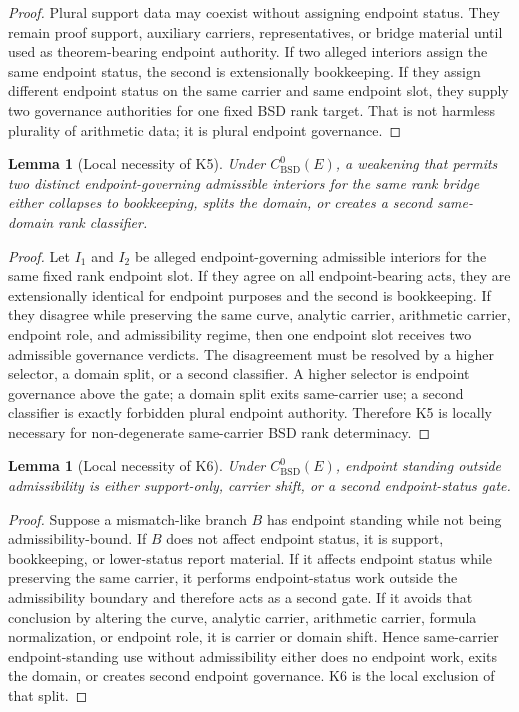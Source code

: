 \documentclass[11pt]{article}
\newtheorem{lemma}[theorem]{Lemma}
\newcommand{\BSD}{\mathrm{BSD}}
\begin{document}
\begin{proof}
Plural support data may coexist without assigning endpoint status. They remain proof support, auxiliary carriers, representatives, or bridge material until used as theorem-bearing endpoint authority. If two alleged interiors assign the same endpoint status, the second is extensionally bookkeeping. If they assign different endpoint status on the same carrier and same endpoint slot, they supply two governance authorities for one fixed BSD rank target. That is not harmless plurality of arithmetic data; it is plural endpoint governance.
\end{proof}

\begin{lemma}[Local necessity of K5]\label{lem:local-k5-bsd}
Under $C^0_{\BSD}(E)$, a weakening that permits two distinct endpoint-governing admissible interiors for the same rank bridge either collapses to bookkeeping, splits the domain, or creates a second same-domain rank classifier.
\end{lemma}

\begin{proof}
Let $I_1$ and $I_2$ be alleged endpoint-governing admissible interiors for the same fixed rank endpoint slot. If they agree on all endpoint-bearing acts, they are extensionally identical for endpoint purposes and the second is bookkeeping. If they disagree while preserving the same curve, analytic carrier, arithmetic carrier, endpoint role, and admissibility regime, then one endpoint slot receives two admissible governance verdicts. The disagreement must be resolved by a higher selector, a domain split, or a second classifier. A higher selector is endpoint governance above the gate; a domain split exits same-carrier use; a second classifier is exactly forbidden plural endpoint authority. Therefore K5 is locally necessary for non-degenerate same-carrier BSD rank determinacy.
\end{proof}

\begin{lemma}[Local necessity of K6]\label{lem:local-k6-bsd}
Under $C^0_{\BSD}(E)$, endpoint standing outside admissibility is either support-only, carrier shift, or a second endpoint-status gate.
\end{lemma}

\begin{proof}
Suppose a mismatch-like branch $B$ has endpoint standing while not being admissibility-bound. If $B$ does not affect endpoint status, it is support, bookkeeping, or lower-status report material. If it affects endpoint status while preserving the same carrier, it performs endpoint-status work outside the admissibility boundary and therefore acts as a second gate. If it avoids that conclusion by altering the curve, analytic carrier, arithmetic carrier, formula normalization, or endpoint role, it is carrier or domain shift. Hence same-carrier endpoint-standing use without admissibility either does no endpoint work, exits the domain, or creates second endpoint governance. K6 is the local exclusion of that split.
\end{proof}
\end{document}
